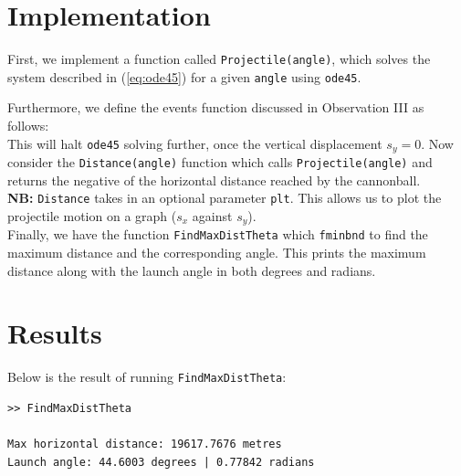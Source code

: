 \documentclass[11pt]{report}
\begin{document}
\section{Implementation}
First, we implement a function called \texttt{Projectile(angle)}, which solves the system described in (\ref{eq:ode45}) for a given \texttt{angle} using \texttt{ode45}.



Furthermore, we define the events function discussed in Observation III as follows:\\



This will halt \texttt{ode45} solving further, once the vertical displacement $s_y=0$. Now consider the \texttt{Distance(angle)} function which calls \texttt{Projectile(angle)} and returns the negative of the horizontal distance reached by the cannonball.\\



\textbf{NB:} \texttt{Distance} takes in an optional parameter \texttt{plt}. This allows us to plot the projectile motion on a graph ($s_x$ against $s_y$).\\

Finally, we have the function \texttt{FindMaxDistTheta} which \texttt{fminbnd} to find the maximum distance and the corresponding angle. This prints the maximum distance along with the launch angle in both degrees and radians.\\



\section{Results}
Below is the result of running \texttt{FindMaxDistTheta}:

\begin{lstlisting}[title={Maximum Horizontal Distance and the launch angle.}]
>> FindMaxDistTheta

Max horizontal distance: 19617.7676 metres
Launch angle: 44.6003 degrees | 0.77842 radians
\end{lstlisting}
\end{document}
